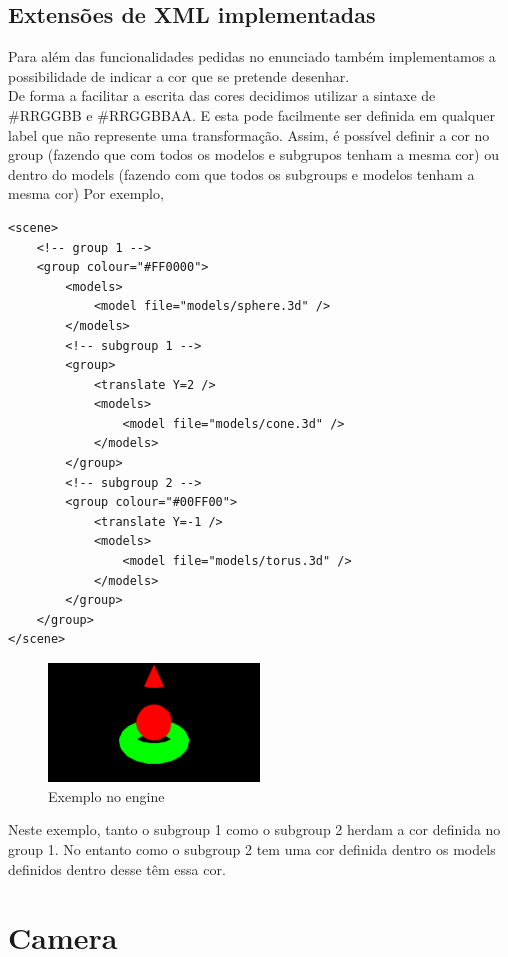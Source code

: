 \documentclass[a4paper]{report}
\begin{document}
\subsection{Extensões de XML implementadas}
Para além das funcionalidades pedidas no enunciado também implementamos a
possibilidade de indicar a cor que se pretende desenhar.\\
De forma a facilitar a escrita das cores decidimos utilizar a sintaxe de
\#RRGGBB
e \#RRGGBBAA. E esta pode facilmente ser definida em qualquer label que não
represente uma transformação. Assim, é possível definir a cor no group (fazendo
que com todos os modelos e subgrupos tenham a mesma cor) ou dentro do models
(fazendo com que todos os subgroups e modelos tenham a mesma cor)
Por exemplo,
\begin{lstlisting}
<scene>
    <!-- group 1 -->
    <group colour="#FF0000">
        <models>
            <model file="models/sphere.3d" />
        </models>
        <!-- subgroup 1 -->
        <group>
            <translate Y=2 />
            <models>
                <model file="models/cone.3d" />
            </models>
        </group>
        <!-- subgroup 2 -->
        <group colour="#00FF00">
            <translate Y=-1 />
            <models>
                <model file="models/torus.3d" />
            </models>
        </group>
    </group>
</scene>
\end{lstlisting}
\begin{figure}[H]
    \centering 
    \includegraphics[width=0.5\textwidth]{images/example.png}
    \caption{Exemplo no engine}
    \label{fig:scheme_torus}
\end{figure}
Neste exemplo, tanto o subgroup 1 como o subgroup 2 herdam a cor definida no
group 1. No entanto como o subgroup 2 tem uma cor definida dentro os models
definidos dentro desse têm essa cor.

\section{Camera}
\end{document}
